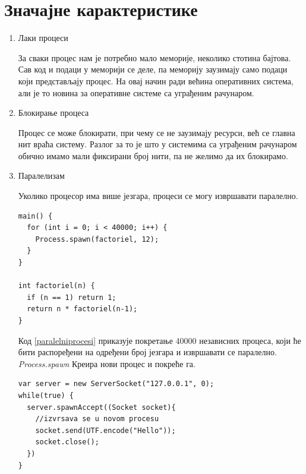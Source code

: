 \documentclass[12pt,oneside]{memoir}
\begin{document}
\section{Значајне карактеристике}
\begin{enumerate} 
\item Лаки процеси

За сваки процес нам је потребно мало меморије, неколико стотина бајтова. Сав код и подаци у меморији се деле, па меморију заузимају само подаци који представљају процес. На овај начин ради већина оперативних система, али је то новина за оперативне системе са уграђеним рачунаром.

\item Блокирање процеса

Процес се може блокирати, при чему се не заузимају ресурси, већ се главна нит враћа систему. Разлог за то је што у системима са уграђеним рачунаром обично имамо мали фиксирани број нити, па не желимо да их блокирамо. 

\item Паралелизам

Уколико процесор има више језгара, процеси се могу извршавати паралелно.

\begin{verbatim}
main() {
  for (int i = 0; i < 40000; i++) {
    Process.spawn(factoriel, 12);
  }
}

int factoriel(n) {
  if (n == 1) return 1;
  return n * factoriel(n-1);
}
\end{verbatim}

Код \ref{paralelniprocesi} приказује покретање 40000 независних процеса, који ће бити распоређени на одређени број језгара и извршавати се паралелно. \textit{Process.spawn} Креира нови процес и покреће га.

\begin{verbatim}
var server = new ServerSocket("127.0.0.1", 0);
while(true) {
  server.spawnAccept((Socket socket){
	//izvrsava se u novom procesu
	socket.send(UTF.encode("Hello"));
	socket.close();
  })
}
\end{verbatim}


\end{enumerate}
\end{document}
